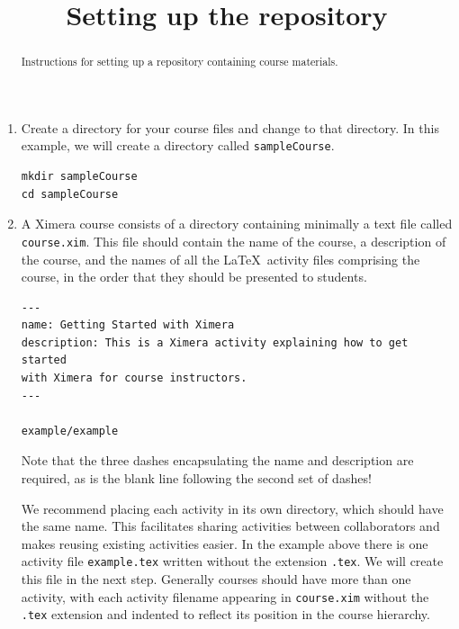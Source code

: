 \documentclass{ximera}
\title{Setting up the repository}
\begin{document}
\begin{abstract}
Instructions for setting up a repository containing course materials.
\end{abstract}
\maketitle
\begin{enumerate}
\item Create a directory for your course files
and change to that directory.
In this example, we will create a directory called \verb!sampleCourse!.
\begin{center}
\begin{verbatim}
mkdir sampleCourse
cd sampleCourse 
\end{verbatim}
\end{center}
\item A Ximera course consists of a directory containing
minimally a text file called \verb!course.xim!. This file should contain
the name of the course, a description of the course,
and the names of all the \LaTeX\ activity files 
comprising the course, in the order
that they should be presented to students.


\begin{verbatim}
---
name: Getting Started with Ximera
description: This is a Ximera activity explaining how to get started
with Ximera for course instructors.
---

example/example
\end{verbatim}

\begin{warning}
Note that the three dashes encapsulating the name and description
are required, as is the blank line following the second set of dashes!
\end{warning}

We recommend placing each
activity in its own directory, which should have the same name.
This facilitates
sharing activities between collaborators and makes reusing existing
activities easier.
In the example above
there is one activity file \verb!example.tex!
written without the extension \verb!.tex!. We will
create this file in the next step.
Generally courses should have more than one activity,
with each activity filename appearing in \verb!course.xim!
without the \verb!.tex! extension and
indented to reflect its position in the course hierarchy.


\end{enumerate}
\end{document}
